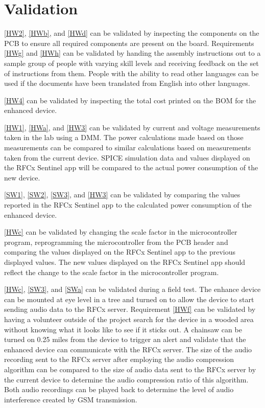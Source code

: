 \documentclass{article}
\numberwithin{figure}{section}
\numberwithin{equation}{section}
\begin{document}
{\section{Validation} \label{sect:validation}
\ref{HW2}, \ref{HWb}, and \ref{HWd} can be validated by inspecting the components on the PCB to ensure all required components are present on the board. Requirements \ref{HWg} and \ref{HWh} can be validated by handing the assembly instructions out to a sample group of people with varying skill levels and receiving feedback on the set of instructions from them. People with the ability to read other languages can be used if the documents have been translated from English into other languages.

\ref{HW4} can be validated by inspecting the total cost printed on the BOM for the enhanced device.

\ref{HW1}, \ref{HWa}, and \ref{HW3} can be validated by current and voltage measurements taken in the lab using a DMM. The power calculations made based on those measurements can be compared to similar calculations based on measurements taken from the current device. SPICE simulation data and values displayed on the RFCx Sentinel app will be compared to the actual power consumption of the new device.

\ref{SW1}, \ref{SW2}, \ref{SW3}, and \ref{HW3} can be validated by comparing the values reported in the RFCx Sentinel app to the calculated power consumption of the enhanced device.

\ref{HWc} can be validated by changing the scale factor in the microcontroller program, reprogramming the microcontroller from the PCB header and comparing the values displayed on the RFCx Sentinel app to the previous displayed values. The new values displayed on the RFCx Sentinel app should reflect the change to the scale factor in the microcontroller program.

\ref{HWc}, \ref{SW3}, and \ref{SWa} can be validated during a field test. The enhance device can be mounted at eye level in a tree and turned on to allow the device to start sending audio data to the RFCx server. Requirement \ref{HWf} can be validated by having a volunteer outside of the project search for the device in a wooded area without knowing what it looks like to see if it sticks out. A chainsaw can be turned on 0.25 miles from the device to trigger an alert and validate that the enhanced device can communicate with the RFCx server. The size of the audio recording sent to the RFCx server after employing the audio compression algorithm can be compared to the size of audio data sent to the RFCx server by the current device to determine the audio compression ratio of this algorithm. Both audio recordings can be played back to determine the level of audio interference created by GSM transmission.

}
\end{document}

